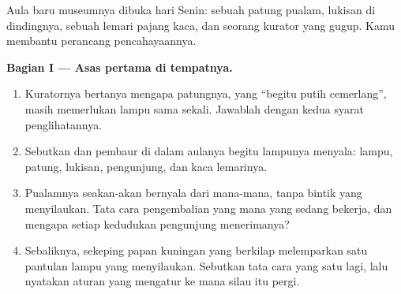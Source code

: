\begin{problem}\label{pb:g7:light-sources-propagation:1}
Aula baru museumnya dibuka hari Senin: sebuah patung pualam,
lukisan di dindingnya, sebuah lemari pajang kaca, dan seorang kurator
yang gugup. Kamu membantu perancang pencahayaannya.

\medskip\noindent\textbf{Bagian I --- Asas pertama di tempatnya.}
\begin{enumerate}
  \item Kuratornya bertanya mengapa patungnya, yang ``begitu putih
        cemerlang'', masih memerlukan lampu sama sekali. Jawablah
        dengan kedua syarat penglihatannya.
  \item Sebutkan  dan pembaur di dalam aulanya begitu
        lampunya menyala: lampu, patung, lukisan, pengunjung, dan kaca
        lemarinya.
  \item Pualamnya seakan-akan bernyala dari mana-mana, tanpa bintik
        yang menyilaukan. Tata cara pengembalian  yang mana yang
        sedang bekerja, dan mengapa setiap kedudukan pengunjung
        menerimanya?
  \item Sebaliknya, sekeping papan kuningan yang berkilap melemparkan
        satu pantulan lampu yang menyilaukan. Sebutkan tata cara yang
        satu lagi, lalu nyatakan aturan yang mengatur ke mana silau
        itu pergi.
\end{enumerate}


\end{problem}
